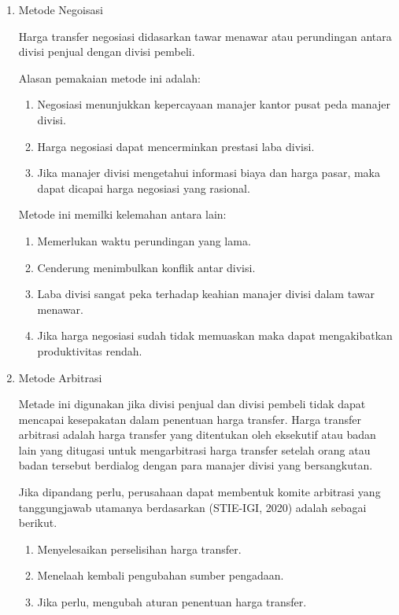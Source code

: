	\begin{enumerate}
		\item Metode Negoisasi
		
		Harga transfer negosiasi didasarkan tawar menawar atau perundingan antara divisi penjual dengan divisi pembeli.

		Alasan pemakaian metode ini adalah:

		\begin{enumerate}
			\item Negosiasi menunjukkan kepercayaan manajer kantor pusat peda manajer divisi.
			\item Harga negosiasi dapat mencerminkan prestasi laba divisi.
			\item Jika manajer divisi mengetahui informasi biaya dan harga pasar, maka dapat dicapai harga negosiasi yang rasional.
		\end{enumerate}

		Metode ini memilki kelemahan antara lain:

		\begin{enumerate}
			\item Memerlukan waktu perundingan yang lama.
			\item Cenderung menimbulkan konflik antar divisi.
			\item Laba divisi sangat peka terhadap keahian manajer divisi dalam tawar menawar.
			\item Jika harga negosiasi sudah tidak memuaskan maka dapat mengakibatkan produktivitas rendah.
		\end{enumerate}

		\item Metode Arbitrasi
		
		Metade ini digunakan jika divisi penjual dan divisi pembeli tidak dapat mencapai kesepakatan dalam penentuan harga transfer. Harga transfer arbitrasi adalah harga transfer yang ditentukan oleh eksekutif atau badan lain yang ditugasi untuk mengarbitrasi harga transfer setelah orang atau badan tersebut berdialog dengan para manajer divisi yang bersangkutan.

		Jika dipandang perlu, perusahaan dapat membentuk komite arbitrasi yang tanggungjawab utamanya berdasarkan (STIE-IGI, 2020) adalah sebagai berikut.

		\begin{enumerate}
			\item Menyelesaikan perselisihan harga transfer.
			\item Menelaah kembali pengubahan sumber pengadaan.
			\item Jika perlu, mengubah aturan penentuan harga transfer.
		\end{enumerate}
	\end{enumerate}

